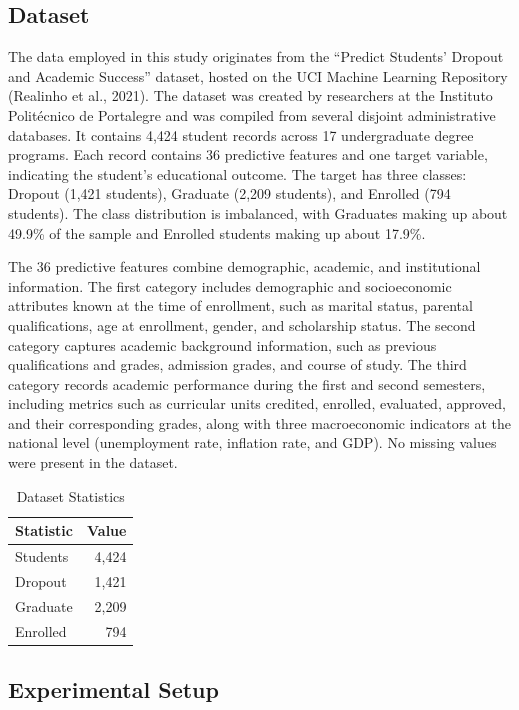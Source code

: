 \documentclass[11pt]{article}
\begin{document}
\subsection{Dataset}
The data employed in this study originates from the ``Predict Students' Dropout and Academic Success'' dataset, hosted on the UCI Machine Learning Repository (Realinho et al., 2021). The dataset was created by researchers at the Instituto Politécnico de Portalegre and was compiled from several disjoint administrative databases. It contains 4,424 student records across 17 undergraduate degree programs. Each record contains 36 predictive features and one target variable, indicating the student's educational outcome. The target has three classes: Dropout (1,421 students), Graduate (2,209 students), and Enrolled (794 students). The class distribution is imbalanced, with Graduates making up about 49.9\% of the sample and Enrolled students making up about 17.9\%.

The 36 predictive features combine demographic, academic, and institutional information. The first category includes demographic and socioeconomic attributes known at the time of enrollment, such as marital status, parental qualifications, age at enrollment, gender, and scholarship status. The second category captures academic background information, such as previous qualifications and grades, admission grades, and course of study. The third category records academic performance during the first and second semesters, including metrics such as curricular units credited, enrolled, evaluated, approved, and their corresponding grades, along with three macroeconomic indicators at the national level (unemployment rate, inflation rate, and GDP). No missing values were present in the dataset.

\begin{table}[h]
\centering
\begin{tabular}{lr}
\toprule
Statistic & Value \\
\midrule
Students & 4,424 \\
Dropout & 1,421 \\
Graduate & 2,209 \\
Enrolled & 794 \\
\bottomrule
\end{tabular}
\caption{Dataset Statistics}
\end{table}

\vspace{-1em}

\subsection{Experimental Setup}
\end{document}
